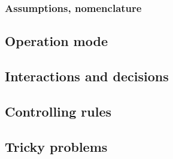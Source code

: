 \subsubsection{Assumptions, nomenclature} %
\label{ssub:assumptions_nomenclature}


\subsection{Operation mode} %
\label{sub:operation_mode}


\subsection{Interactions and decisions} %
\label{sub:interactions_and_decisions}


\subsection{Controlling rules} %
\label{sub:controlling_rules}


\subsection{Tricky problems} %
\label{sub:tricky_problems}

